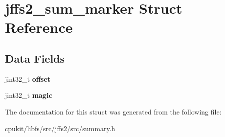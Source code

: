 \hypertarget{structjffs2__sum__marker}{}\section{jffs2\+\_\+sum\+\_\+marker Struct Reference}
\label{structjffs2__sum__marker}
\subsection*{Data Fields}
\begin{DoxyCompactItemize}
\item 
\mbox{\label{structjffs2__sum__marker_a426c6efe51b3a1f20929f1795b8159fe}} 
jint32\+\_\+t {\bfseries offset}
\item 
\mbox{\label{structjffs2__sum__marker_a3e2a13cd055a181edfb3aa7ff297e78e}} 
jint32\+\_\+t {\bfseries magic}
\end{DoxyCompactItemize}


The documentation for this struct was generated from the following file\+:\begin{DoxyCompactItemize}
\item 
cpukit/libfs/src/jffs2/src/summary.\+h\end{DoxyCompactItemize}
